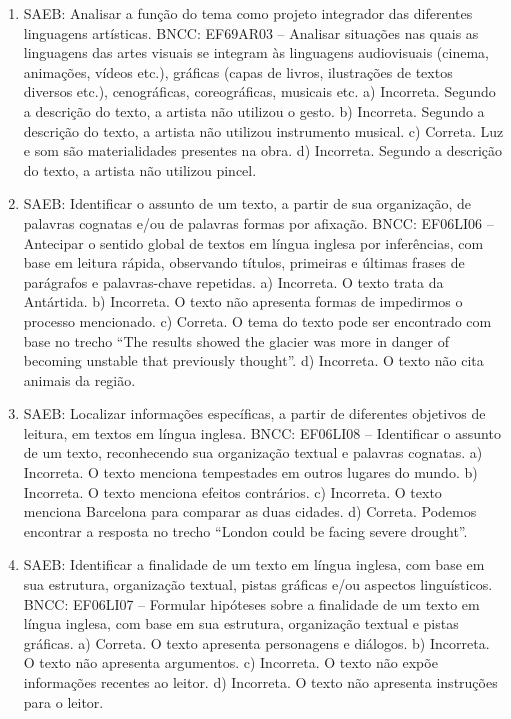 \begin{enumerate}
\item
SAEB: Analisar a função do tema como projeto integrador das diferentes
linguagens artísticas.
BNCC: EF69AR03 -- Analisar situações nas quais as linguagens das artes
visuais se integram às linguagens audiovisuais (cinema, animações,
vídeos etc.), gráficas (capas de livros, ilustrações de textos diversos
etc.), cenográficas, coreográficas, musicais etc.
a) Incorreta. Segundo a descrição do texto, a artista não utilizou o
  gesto.
b) Incorreta. Segundo a descrição do texto, a artista não utilizou
  instrumento musical.
c) Correta. Luz e som são materialidades presentes na obra.
d) Incorreta. Segundo a descrição do texto, a artista não utilizou
  pincel.

\item
SAEB: Identificar o assunto de um texto, a partir de sua organização, de
palavras cognatas e/ou de palavras formas por afixação. BNCC: EF06LI06
-- Antecipar o sentido global de textos em língua inglesa por
inferências, com base em leitura rápida, observando títulos, primeiras e
últimas frases de parágrafos e palavras-chave repetidas.
a) Incorreta. O texto trata da Antártida. b) Incorreta. O texto não
apresenta formas de impedirmos o processo mencionado. c) Correta. O tema
do texto pode ser encontrado com base no trecho ``The results showed the
glacier was more in danger of becoming unstable that previously
thought''. d) Incorreta. O texto não cita animais da região.

\item
SAEB: Localizar informações específicas, a partir de diferentes
objetivos de leitura, em textos em língua inglesa. BNCC: EF06LI08 --
Identificar o assunto de um texto, reconhecendo sua organização textual
e palavras cognatas.
a) Incorreta. O texto menciona tempestades em outros lugares do mundo.
b) Incorreta. O texto menciona efeitos contrários. c) Incorreta. O texto
menciona Barcelona para comparar as duas cidades. d) Correta. Podemos
encontrar a resposta no trecho ``London could be facing severe
drought''.

\item
SAEB: Identificar a finalidade de um texto em língua inglesa, com base
em sua estrutura, organização textual, pistas gráficas e/ou aspectos
linguísticos. BNCC: EF06LI07 -- Formular hipóteses sobre a finalidade de
um texto em língua inglesa, com base em sua estrutura, organização
textual e pistas gráficas.
a) Correta. O texto apresenta personagens e diálogos. b) Incorreta. O
texto não apresenta argumentos. c) Incorreta. O texto não expõe
informações recentes ao leitor. d) Incorreta. O texto não apresenta
instruções para o leitor.


\end{enumerate}
